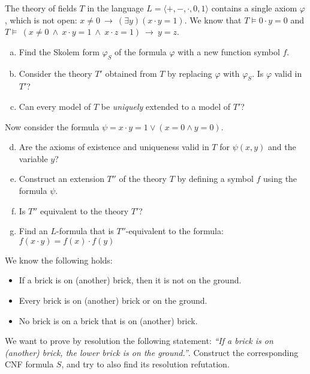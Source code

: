 \begin{problem}

    The theory of fields $T$ in the language $L=\langle +,-,\cdot,0,1\rangle$ contains a single axiom $\varphi$, which is not open: $x\neq 0\ \to\ (\exists y)(x\cdot y=1)$. We know that $T\models 0\cdot y=0$ and $T\models\ (x\ne 0\ \wedge\ x\cdot y=1\ \wedge\ x\cdot z=1)\ \to\ y=z$.
    \begin{enumerate}[(a)]
        \item Find the Skolem form $\varphi_S$ of the formula $\varphi$ with a new function symbol $f$.
        \item Consider the theory $T'$ obtained from $T$ by replacing $\varphi$ with $\varphi_S$. Is $\varphi$ valid in $T'$?
        \item Can every model of $T$ be \emph{uniquely} extended to a model of $T'$?
    \end{enumerate}
    Now consider the formula $\psi=x\cdot y=1\vee  (x=0 \wedge y=0)$.
    \begin{enumerate}[(a)]
        \setcounter{enumi}{3}
        \item Are the axioms of existence and uniqueness valid in $T$ for $\psi(x,y)$ and the variable $y$?
        \item Construct an extension $T''$ of the theory $T$ by defining a symbol $f$ using the formula $\psi$.
        \item Is $T''$ equivalent to the theory $T'$?
        \item Find an $L$-formula that is $T''$-equivalent to the formula:
        $f(x\cdot y)=f(x)\cdot f(y)$
    \end{enumerate}

\end{problem}


\medskip\begin{problem} We know the following holds:
    \begin{itemize}\it
        \item If a brick is on (another) brick, then it is not on the ground.
        \item Every brick is on (another) brick or on the ground.
        \item No brick is on a brick that is on (another) brick.
    \end{itemize}
    We want to prove by resolution the following statement: {\it ``If a brick is on (another) brick, the lower brick is on the ground.''}. Construct the corresponding CNF formula $S$, and try to also find its resolution refutation.
\end{problem}

